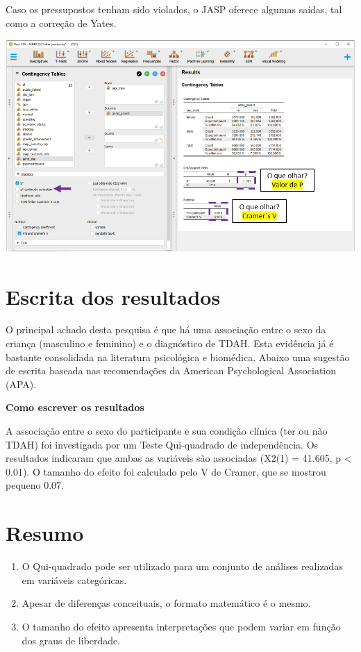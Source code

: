 \documentclass[
]{book}
\providecommand{\tightlist}{%
  \setlength{\itemsep}{0pt}\setlength{\parskip}{0pt}}
\begin{document}
Caso os pressupostos tenham sido violados, o JASP oferece algumas saídas, tal como a correção de Yates.

\includegraphics{./img/cap_x2_yates.png}

\hypertarget{escrita-dos-resultados}{%
\section{Escrita dos resultados}\label{escrita-dos-resultados}}

O principal achado desta pesquisa é que há uma associação entre o sexo da criança (masculino e feminino) e o diagnóstico de TDAH. Esta evidência já é bastante consolidada na literatura psicológica e biomédica. Abaixo uma sugestão de escrita baseada nas recomendações da American Psychological Association (APA).

\textbf{Como escrever os resultados}

A associação entre o sexo do participante e sua condição clínica (ter ou não TDAH) foi investigada por um Teste Qui-quadrado de independência. Os resultados indicaram que ambas as variáveis são associadas (X2(1) = 41.605, p \textless{} 0.01). O tamanho do efeito foi calculado pelo V de Cramer, que se mostrou pequeno 0.07.

\hypertarget{resumo-6}{%
\section{Resumo}\label{resumo-6}}

\begin{enumerate}
\def\labelenumi{\arabic{enumi}.}
\tightlist
\item
  O Qui-quadrado pode ser utilizado para um conjunto de análises realizadas em variáveis categóricas.\\
\item
  Apesar de diferenças conceituais, o formato matemático é o mesmo.\\
\item
  O tamanho do efeito apresenta interpretações que podem variar em função dos graus de liberdade.\\
\end{enumerate}
\end{document}
